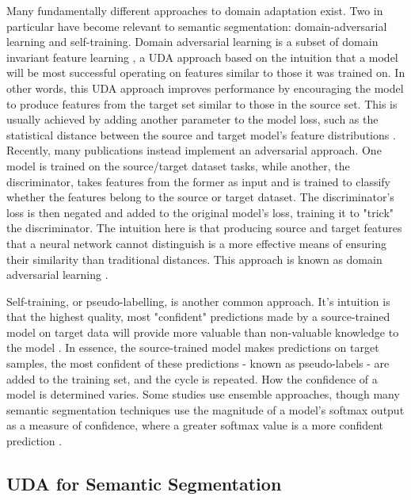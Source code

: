 \documentclass[a4paper,12pt]{report}
\begin{document}
Many fundamentally different approaches to domain adaptation exist. Two in particular have become relevant to semantic segmentation: domain-adversarial learning and self-training. Domain adversarial learning is a subset of domain invariant feature learning \cite{wilson_survey_2020}, a UDA approach based on the intuition that a model will be most successful operating on features similar to those it was trained on. In other words, this UDA approach improves performance by encouraging the model to produce features from the target set similar to those in the source set. This is usually achieved by adding another parameter to the model loss, such as the statistical distance between the source and target model's feature distributions \cite{gretton_kernel_2006} \cite{sun_return_2015}. Recently, many publications instead implement an adversarial \cite{goodfellow_generative_2014} approach. One model is trained on the source/target dataset tasks, while another, the discriminator, takes features from the former as input and is trained to classify whether the features belong to the source or target dataset. The discriminator's loss is then negated and added to the original model's loss, training it to "trick" the discriminator. The intuition here is that producing source and target features that a neural network cannot distinguish is a more effective means of ensuring their similarity than traditional distances. This approach is known as domain adversarial learning \cite{ganin_domain-adversarial_2016}.

Self-training, or pseudo-labelling, is another common approach. It's intuition is that the highest quality, most "confident" predictions made by a source-trained model on target data will provide more valuable than non-valuable knowledge to the model \cite{wilson_survey_2020} \cite{kamnitsas_transductive_2021}. In essence, the source-trained model makes predictions on target samples, the most confident of these predictions - known as pseudo-labels - are added to the training set, and the cycle is repeated. How the confidence of a model is determined varies. Some studies use ensemble approaches, though many semantic segmentation techniques use the magnitude of a model's softmax output as a measure of confidence, where a greater softmax value is a more confident prediction \cite{zou_domain_2018}.


\subsection*{UDA for Semantic Segmentation}
\end{document}
